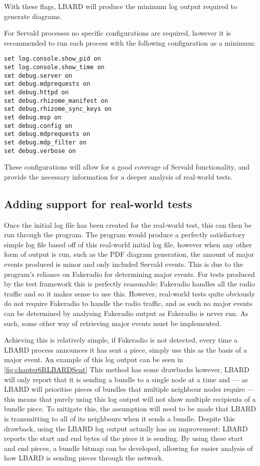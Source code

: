 With these flags, LBARD will produce the minimum log output required to generate diagrams. 

For Servald processes no specific configurations are required, however it is recommended to run each process with the following configuration as a minimum:
\begin{lstlisting}
set log.console.show_pid on 
set log.console.show_time on 
set debug.server on 
set debug.mdprequests on 
set debug.httpd on 
set debug.rhizome_manifest on
set debug.rhizome_sync_keys on
set debug.msp on
set debug.config on
set debug.mdprequests on
set debug.mdp_filter on
set debug.verbose on
\end{lstlisting}
These configurations will allow for a good coverage of Servald functionality, and provide the necessary information for a deeper analysis of real-world tests.


\subsection{Adding support for real-world tests}
Once the initial log file has been created for the real-world test, this can then be run through the program. 
The program would produce a perfectly satisfactory simple log file based off of this real-world initial log file, however when any other form of output is run, such as the PDF diagram generation, the amount of major events produced is minor and only included Servald events.
This is due to the program's reliance on Fakeradio for determining major events.
For tests produced by the test framework this is perfectly reasonable; Fakeradio handles all the radio traffic and so it makes sense to use this.
However, real-world tests quite obviously do not require Fakeradio to handle the radio traffic, and as such no major events can be determined by analysing Fakeradio output as Fakeradio is never run.
As such, some other way of retrieving major events must be implemented.

Achieving this is relatively simple, if Fakeradio is not detected, every time a LBARD process announces it has sent a piece, simply use this as the basis of a major event.
An example of this log output can be seen in \figurename{ \ref{fig:chapter6RLBARDSent}}
This method has some drawbacks however, LBARD will only report that it is sending a bundle to a single node at a time and — as LBARD will prioritise pieces of bundles that multiple neighbour nodes require — this means that purely using this log output will not show multiple recipients of a bundle piece.
To mitigate this, the assumption will need to be made that LBARD is transmitting to all of its neighbours when it sends a bundle.
Despite this drawback, using the LBARD log output actually has an improvement: LBARD reports the start and end bytes of the piece it is sending.
By using these start and end pieces, a bundle bitmap can be developed, allowing for easier analysis of how LBARD is sending pieces through the network.

